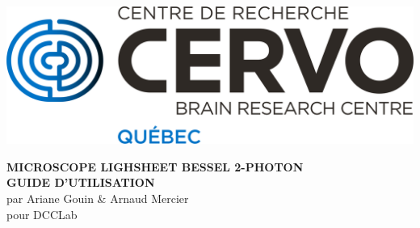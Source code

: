 \begin{flushleft}
\includegraphics[scale=0.5]{logo-cervo.png}
\end{flushleft}

\begin{center}
\vspace{1cm}

    \begin{large}
    \textbf{MICROSCOPE LIGHSHEET BESSEL 2-PHOTON \\ GUIDE D'UTILISATION} \\ [0.5cm]
    par Ariane Gouin \& Arnaud Mercier \\
    pour DCCLab
    \end{large}

\end{center}
\vspace{0.5cm}